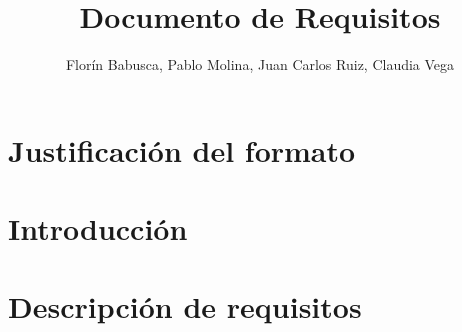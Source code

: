 \documentclass[12pt, a4paper]{exam}
\title{\textbf{Documento de Requisitos}}
\author{Florín Babusca, Pablo Molina, Juan Carlos Ruiz, Claudia Vega}
\begin{document}

\begin{titlingpage}
\maketitle
\end{titlingpage}
\tableofcontents


\section{Justificación del formato}


\section{Introducción}


\section{Descripción de requisitos}



\end{document}
